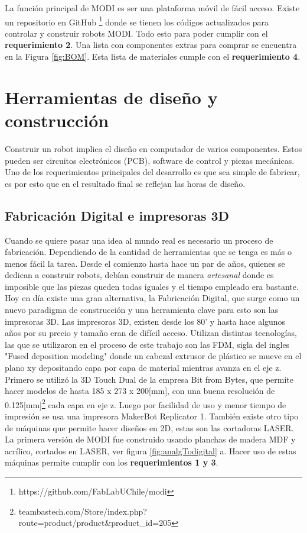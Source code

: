 La función principal de MODI es ser una plataforma móvil de fácil acceso. Existe un repositorio en GitHub  \footnote{https://github.com/FabLabUChile/modi} donde se tienen los códigos actualizados para controlar y construir robots MODI. Todo esto para poder cumplir con el \textbf{requerimiento 2}. Una lista con componentes extras para comprar se encuentra en la Figura \ref{fig:BOM}. Esta lista de materiales cumple con el \textbf{requerimiento 4}.


\section{Herramientas de diseño y construcción}

Construir un robot implica el diseño en computador de varios componentes. Estos pueden ser circuitos electrónicos (PCB), software de control y piezas mecánicas. Uno de los requerimientos principales del desarrollo es que sea simple de fabricar, es por esto que en el resultado final se reflejan las horas de diseño.

\subsection{Fabricación Digital e impresoras 3D}
Cuando se quiere pasar una idea al mundo real es necesario un proceso de fabricación. Dependiendo de la cantidad de herramientas que se tenga es más o menos fácil la tarea. Desde el comienzo hasta hace un par de años, quienes se dedican a construir robots, debían construir de manera \textit{artesanal} donde es imposible que las piezas queden todas iguales y el tiempo empleado era bastante. Hoy en día existe una gran alternativa, la Fabricación Digital, que surge como un nuevo paradigma de construcción y una herramienta clave para esto son las impresoras 3D. Las impresoras 3D, existen desde los 80' y hasta hace algunos años por su precio y tamaño eran de difícil acceso. Utilizan distintas tecnologías, las que se utilizaron en el proceso de este trabajo son las FDM, sigla del ingles "Fused deposition modeling" donde un cabezal extrusor de plástico se mueve en el plano xy depositando capa por capa de material mientras avanza en el eje z. Primero se utilizó la 3D Touch Dual de la empresa Bit from Bytes, que permite hacer modelos de hasta 185 x 273 x 200[mm], con una buena resolución de 0.125[mm]\footnote{teambastech.com/Store/index.php?route=product/product\&product\_id=205} cada capa en eje z. Luego por facilidad de uso y menor tiempo de impresión se usa una impresora MakerBot Replicator 1. También existe otro tipo de máquinas que permite hacer diseños en 2D, estas son las cortadoras LASER. La primera versión de MODI fue construido usando planchas de madera MDF y acrílico, cortados en LASER, ver figura \ref{fig:analgTodigital} a. Hacer uso de estas máquinas permite cumplir con los \textbf{requerimientos 1 y 3}.

